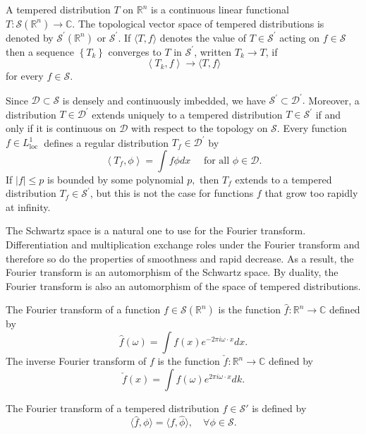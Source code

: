 \begin{definition}
A tempered distribution $T$ on $\mathbb{R}^{n}$ is a continuous linear functional $T: \mathcal{S}\left(\mathbb{R}^{n}\right) \rightarrow \mathbb{C} .$ The topological vector space of tempered distributions is denoted by $\mathcal{S}^{\prime}\left(\mathbb{R}^{n}\right)$ or $\mathcal{S}^{\prime} .$ If $\langle T, f\rangle$ denotes the value of $T \in \mathcal{S}^{\prime}$ acting on $f \in \mathcal{S}$
then a sequence $\left\{T_{k}\right\}$ converges to $T$ in $\mathcal{S}^{\prime}$, written $T_{k} \rightarrow T$, if
$$
\left\langle T_{k}, f\right\rangle \rightarrow\langle T, f\rangle
$$
for every $f \in \mathcal{S}$.
\end{definition}
Since $\mathcal{D} \subset \mathcal{S}$ is densely and continuously imbedded, we have $\mathcal{S}^{\prime} \subset \mathcal{D}^{\prime} .$ Moreover, a distribution $T \in \mathcal{D}^{\prime}$ extends uniquely to a tempered distribution $T \in \mathcal{S}^{\prime}$ if and only if it is continuous on $\mathcal{D}$ with respect to the topology on $\mathcal{S}$. Every function $f \in L_{\text {loc }}^{1}$ defines a regular distribution $T_{f} \in \mathcal{D}^{\prime}$ by
$$
\left\langle T_{f}, \phi\right\rangle=\int f \phi d x \quad \text { for all } \phi \in \mathcal{D}.
$$
If $|f| \leq p$ is bounded by some polynomial $p,$ then $T_{f}$ extends to a tempered distribution $T_{f} \in \mathcal{S}^{\prime}$, but this is not the case for functions $f$ that grow too rapidly at infinity.

The Schwartz space is a natural one to use for the Fourier transform. Differentiation and multiplication exchange roles under the Fourier transform and therefore so do the properties of smoothness and rapid decrease. As a result, the Fourier transform is an automorphism of the Schwartz space. By duality, the Fourier transform is also an automorphism of the space of tempered distributions.

\begin{definition}\label{def:fourier1}
The Fourier transform of a function $f \in \mathcal{S}\left(\mathbb{R}^{n}\right)$ is the function $\hat{f}: \mathbb{R}^{n} \rightarrow \mathbb{C}$ defined by 
$$
\hat{f}(\omega)= \int f(x) e^{-2 \pi i\omega \cdot x} d x.
$$
The inverse Fourier transform of $f$ is the function $\check{f}: \mathbb{R}^{n} \rightarrow \mathbb{C}$ defined by
$$
\check{f}(x)=\int f(\omega) e^{2 \pi i\omega \cdot x} d k.
$$
\end{definition}

\begin{definition}\label{def:fourier2}
The Fourier transform of a tempered distribution $f \in \mathcal{S}'$ is  defined by 
$$
\langle \hat{f}, \phi\rangle = \langle f, \hat \phi\rangle,\quad \forall \phi\in \mathcal{S}.
$$ 
\end{definition}

